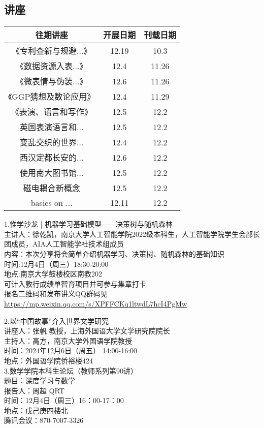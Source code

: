 \documentclass[letterpaper, 12pt]{article}
\begin{document}
\begin{multicols}{2}

\section{讲座}
\begin{tabular}{|c|c|c|}
    \hline
    往期讲座 & 开展日期 & 刊载日期\\
    \hline\hline
    《专利查新与规避...》 & 12.19 & 10.3\\
    《数据资源入表...》 & 12.4 & 11.26\\
    《微表情与伪装...》 & 12.6 & 11.26\\
    《GGP猜想及数论应用》 & 12.4 & 11.29\\
    《表演、语言和写作》 & 12.5 & 12.2\\
    英国表演语言和... & 12.5 & 12.2\\
    变乱交织的世界... & 12.4 & 12.2\\
    西汉定都长安的... & 12.6 & 12.2\\
    使用南大图书馆... & 12.5 & 12.2\\
    磁电耦合新概念 & 12.5 & 12.2\\
    basics on ... & 12.11 & 12.2\\
    \hline
\end{tabular}

1.惟学沙龙 | 机器学习基础模型——决策树与随机森林\\
主讲人：徐乾凯，南京大学人工智能学院2022级本科生，人工智能学院学生会部长团成员，AIA人工智能学社技术组成员\\
内容：本次分享将会简单介绍机器学习、决策树、随机森林的基础知识\\
时间:12月4日（周三）18:30-20:00\\
地点:南京大学鼓楼校区南教202\\
可计入敦行成绩单智育项目并可参与集章打卡~\\
报名二维码和发布讲义QQ群码见\url{https://mp.weixin.qq.com/s/XPFFCKq1ltwdL7hcI4PgMw}

2.以“中国故事”介入世界文学研究\\
讲座人：张帆 教授，上海外国语大学文学研究院院长\\
主持人：高方，南京大学外国语学院教授\\
时间：2024年12月6日（周五） 14:00-16:00\\
地点：外国语学院侨裕楼424\\

3.数学学院本科生论坛（教师系列第90讲）\\
题目：深度学习与数学\\
报告人：周超 QRT\\
时间：12月4日（周三）16：00-17：00\\
地点：戊己庚四楼北\\
腾讯会议：870-7007-3326\\


\end{multicols}
\end{document}
